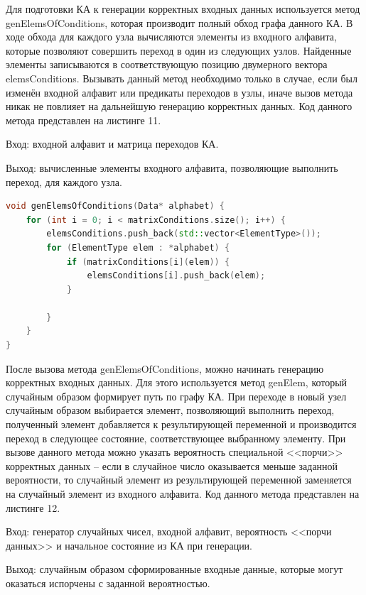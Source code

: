 \documentclass[a4paper,final]{article}
\begin{document}
Для подготовки КА к генерации корректных входных данных используется метод genElemsOfConditions, которая производит полный обход графа данного КА. В ходе обхода для каждого узла вычисляются элементы из входного алфавита, которые позволяют совершить переход в один из следующих узлов. Найденные элементы записываются в соответствующую позицию двумерного вектора elemsConditions. Вызывать данный метод необходимо только в случае, если был изменён входной алфавит или предикаты переходов в узлы, иначе вызов метода никак не повлияет на дальнейшую генерацию корректных данных. Код данного метода представлен на листинге 11.

Вход: входной алфавит и матрица переходов КА.

Выход: вычисленные элементы входного алфавита, позволяющие выполнить переход, для каждого узла.

\footnotesize{
\begin{lstlisting}[language=C++, caption = {Код метода genElemsOfConditions}]
void genElemsOfConditions(Data* alphabet) {
	for (int i = 0; i < matrixConditions.size(); i++) {
        elemsConditions.push_back(std::vector<ElementType>());
		for (ElementType elem : *alphabet) {
            if (matrixConditions[i](elem)) {
                elemsConditions[i].push_back(elem);
            }
            
		}
	}
}
\end{lstlisting}
}
\small

После вызова метода genElemsOfConditions, можно начинать генерацию корректных входных данных. Для этого используется метод genElem, который случайным образом формирует путь по графу КА. При переходе в новый узел случайным образом выбирается элемент, позволяющий выполнить переход, полученный элемент добавляется к результирующей переменной и производится переход в следующее состояние, соответствующее выбранному элементу. При вызове данного метода можно указать вероятность специальной <<порчи>> корректных данных -- если в случайное число оказывается меньше заданной вероятности, то случайный элемент из результирующей переменной заменяется на случайный элемент из входного алфавита. Код данного метода представлен на листинге 12.

Вход: генератор случайных чисел, входной алфавит, вероятность <<порчи данных>> и начальное состояние из КА при генерации.

Выход: случайным образом сформированные входные данные, которые могут оказаться испорчены с заданной вероятностью.
\end{document}
